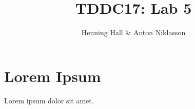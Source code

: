 \documentclass{article}
\begin{document}
\title{TDDC17: Lab 5}
\author{Henning Hall \& Anton Niklasson}
\maketitle


\section{Lorem Ipsum}

Lorem ipsum dolor sit amet.
\end{document}
